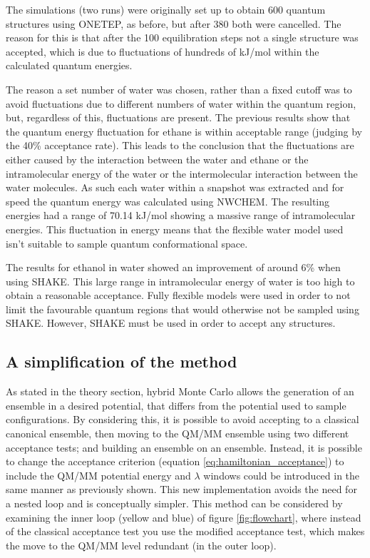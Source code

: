The simulations (two runs) were originally set up to obtain 600 quantum structures using ONETEP, as before, but after 380 both were cancelled.  The reason for this is that after the 100 equilibration steps not a single structure was accepted, which is due to fluctuations of hundreds of kJ/mol within the calculated quantum energies.

The reason a set number of water was chosen, rather than a fixed cutoff was to avoid fluctuations due to different numbers of water within the quantum region, but, regardless of this, fluctuations are present.  The previous  results show that the quantum energy fluctuation for ethane is within acceptable range (judging by the 40\% acceptance rate).  This leads to the conclusion that the fluctuations are either caused by the interaction between the water and ethane or the intramolecular energy of the water or the intermolecular interaction between the water molecules.  As such each water within a snapshot was extracted and for speed the quantum energy was calculated using NWCHEM.  The resulting energies had a range of 70.14 kJ/mol showing a massive range of intramolecular energies.  This fluctuation in energy means that the flexible water model used isn't suitable to sample quantum conformational space.

The results for ethanol in water showed an improvement of around 6\% when using SHAKE.  This large range in intramolecular energy of water is too high to obtain a reasonable acceptance.  Fully flexible models were used in order to not limit the favourable quantum regions that would otherwise not be sampled using SHAKE.  However, SHAKE must be used in order to accept any structures.


\subsection{A simplification of the method}

As stated in the theory section, hybrid Monte Carlo allows the generation of an ensemble in a desired potential, that differs from the potential used to sample configurations.  By considering this, it is possible to avoid accepting to a classical canonical ensemble, then moving to the QM/MM ensemble using two different acceptance tests; and building an ensemble on an ensemble.  Instead, it is possible to change the acceptance criterion (equation \ref{eq:hamiltonian_acceptance}) to include the QM/MM potential energy and $\lambda$ windows could be introduced in the same manner as previously shown.  This new implementation avoids the need for a nested loop and is conceptually simpler.  This method can be considered by examining the inner loop (yellow and blue) of figure \ref{fig:flowchart}, where instead of the classical acceptance test you use the modified acceptance test, which makes the move to the QM/MM level redundant (in the outer loop).

